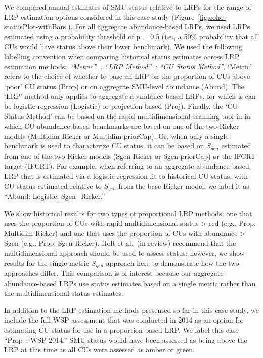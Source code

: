 \documentclass[11pt]{book}
\begin{document}
We compared annual estimates of SMU status relative to LRPs for the range of LRP estimation options considered in this case study (Figure~\ref{fig:coho-statusPlot-withBars}). For all aggregate abundance-based LRPs, we used LRPs estimated using a probability threshold of p = 0.5 (i.e., a 50\% probability that all CUs would have status above their lower benchmark). We used the following labelling convention when comparing historical status estimates across LRP estimation methods: \emph{``Metric''~: ``LRP Method''~: ``CU Status Method''}. `Metric' refers to the choice of whether to base an LRP on the proportion of CUs above `poor' CU status (Prop) or on aggregate SMU-level abundance (Abund). The `LRP' method only applies to aggregate-abundance based LRPs, for which is can be logistic regression (Logistic) or projection-based (Proj). Finally, the `CU Status Method' can be based on the rapid multidimensional scanning tool in in which CU abundance-based benchmarks are based on one of the two Ricker models (Multidim-Ricker or Multidim-priorCap). Or, when only a single benchmark is used to characterize CU status, it can be based on \(S_{gen}\) estimated from one of the two Ricker models (Sgen-Ricker or Sgen-priorCap) or the IFCRT target (IFCRT). For example, when referring to an aggregate abundance-based LRP that is estimated via a logistic regression fit to historical CU status, with CU status estimated relative to \(S_{gen}\) from the base Ricker model, we label it as ``Abund: Logistic: Sgen\_Ricker.''

We show historical results for two types of proportional LRP methods: one that uses the proportion of CUs with rapid multidimensional status \textgreater{} red (e.g., Prop: Multidim-Ricker) and one that uses the proportion of CUs with abundance \textgreater{} Sgen (e.g., Prop: Sgen-Ricker). Holt et al.~(in review) recommend that the multidimensional approach should be used to assess status; however, we show results for the single metric \(S_{gen}\) approach here to demonstrate how the two approaches differ. This comparison is of interest because our aggregate abundance-based LRPs use status estimates based on a single metric rather than the multidimensional status estimates.

In addition to the LRP estimation methods presented so far in this case study, we include the full WSP assessment that was conducted in 2014 as an option for estimating CU status for use in a proportion-based LRP. We label this case ``Prop~: WSP-2014.'' SMU status would have been assessed as being above the LRP at this time as all CUs were assessed as amber or green.
\end{document}
